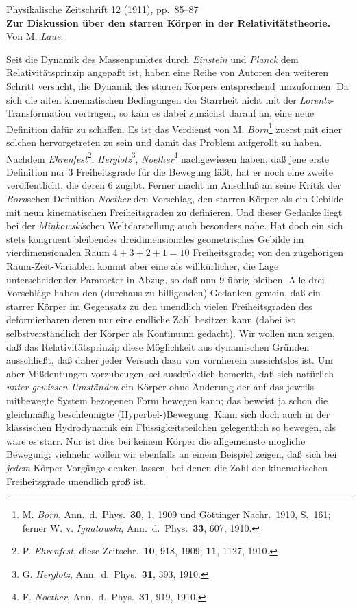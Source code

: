 \documentclass[12pt,a4paper]{article}
\newcommand{\opage}[1]{\marginnote{\footnotesize\textit{[#1]}}}
\begin{document}
\thispagestyle{plain}
\begin{center}
{\small Physikalische Zeitschrift 12 (1911), pp.~85--87}\\[1.5em]
{\Large\bfseries Zur Diskussion über den starren Körper in der Relativitätstheorie.}\\[1em]
{\large Von M. \emph{Laue}.}
\end{center}
\bigskip

\opage{85}
Seit die Dynamik des Massenpunktes durch \emph{Einstein} und \emph{Planck} dem Relativitätsprinzip angepaßt ist, haben eine Reihe von Autoren den weiteren Schritt versucht, die Dynamik des starren Körpers entsprechend umzuformen.
Da sich die alten kinematischen Bedingungen der Starrheit nicht mit der \emph{Lorentz}-Transformation vertragen, so kam es dabei zunächst darauf an, eine neue Definition dafür zu schaffen.
Es ist das Verdienst von M. \emph{Born}\footnote[1]{M. \emph{Born}, Ann.\ d.\ Phys.\ \textbf{30}, 1, 1909 und Göttinger Nachr.\ 1910, S.~161; ferner W. v. \emph{Ignatowski}, Ann.\ d.\ Phys.\ \textbf{33}, 607, 1910.} zuerst mit einer solchen hervorgetreten zu sein und damit das Problem aufgerollt zu haben.
Nachdem \emph{Ehrenfest}\footnote[2]{P. \emph{Ehrenfest}, diese Zeitschr.\ \textbf{10}, 918, 1909; \textbf{11}, 1127, 1910.}, \emph{Herglotz}\footnote[3]{G. \emph{Herglotz}, Ann.\ d.\ Phys.\ \textbf{31}, 393, 1910.}, \emph{Noether}\footnote[4]{F. \emph{Noether}, Ann.\ d.\ Phys.\ \textbf{31}, 919, 1910.} nachgewiesen haben, daß jene erste Definition nur 3 Freiheitsgrade für die Bewegung läßt, hat er noch eine zweite veröffentlicht, die deren 6 zugibt.
Ferner macht im Anschluß an seine Kritik der \emph{Born}schen Definition \emph{Noether} den Vorschlag, den starren Körper als ein Gebilde mit neun kinematischen Freiheitsgraden zu definieren.
Und dieser Gedanke liegt bei der \emph{Minkowski}schen Weltdarstellung auch besonders nahe.
Hat doch ein sich stets kongruent bleibendes dreidimensionales geometrisches Gebilde im vierdimensionalen Raum $4 + 3 + 2 + 1 = 10$ Freiheitsgrade; von den zugehörigen Raum-Zeit-Variablen kommt aber eine als willkürlicher, die Lage unterscheidender Parameter in Abzug, so daß nun 9 übrig bleiben.
Alle drei Vorschläge haben den (durchaus zu billigenden) Gedanken gemein, daß ein starrer Körper im Gegensatz zu den unendlich vielen Freiheitsgraden des deformierbaren deren nur eine endliche Zahl besitzen kann (dabei ist selbstverständlich der Körper als Kontinuum gedacht).
Wir wollen nun zeigen, daß das Relativitätsprinzip diese Möglichkeit aus dynamischen Gründen ausschließt, daß daher jeder Versuch dazu von vornherein aussichtslos ist.
Um aber Mißdeutungen vorzubeugen, sei ausdrücklich bemerkt, daß sich natürlich \emph{unter gewissen Umständen} ein Körper ohne Änderung der auf das jeweils mitbewegte System bezogenen Form bewegen kann; das beweist ja schon die gleichmäßig beschleunigte (Hyperbel-)Bewegung.
Kann sich doch auch in der klässischen Hydrodynamik ein Flüssigkeitsteilchen gelegentlich so bewegen, als wäre es starr. %
Nur ist dies bei
\opage{86}
keinem Körper die allgemeinste mögliche Bewegung; vielmehr wollen wir ebenfalls an einem Beispiel zeigen, daß sich bei \emph{jedem} Körper Vorgänge denken lassen, bei denen die Zahl der kinematischen Freiheitsgrade unendlich groß ist.
\end{document}
